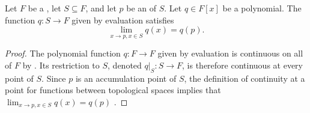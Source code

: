 \begin{corollary} \label{corollary:limit_of_polynomial_function_over_topological_field_at_accumulation_point}
    Let $F$ be a , let $S \subseteq F$, and let $p$ be an  of $S$. Let $q \in F[x]$ be a polynomial. The function $q : S \to F$ given by evaluation satisfies
    $$\lim_{x \to p, x \in S} q(x) = q(p).$$
\end{corollary}
\begin{proof}
    The polynomial function $q : F \to F$ given by evaluation is continuous on all of $F$ by . Its restriction to $S$, denoted $q|_S : S \to F$, is therefore continuous at every point of $S$. Since $p$ is an accumulation point of $S$, the definition of continuity at a point for functions between topological spaces implies that $\lim_{x \to p, x \in S} q(x) = q(p)$ .
\end{proof}
